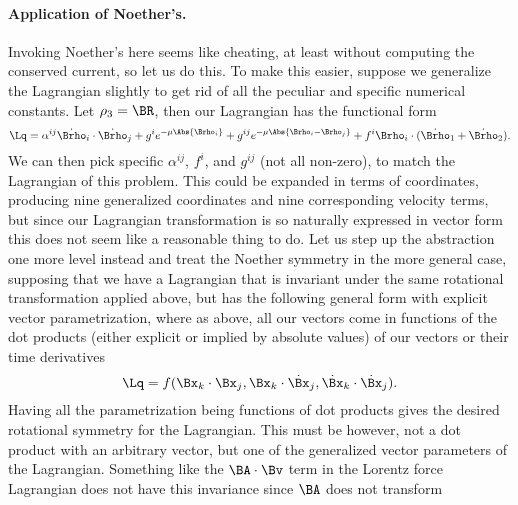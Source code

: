 {\paragraph{Application of Noether's.}
Invoking Noether's here seems like cheating, at least without computing the conserved current, so let us do this.
%
%
To make this easier, suppose we generalize the Lagrangian slightly to get rid of all the peculiar and specific numerical constants.  Let
\(\rho_3 = \BR\), then our Lagrangian has the functional form
%
\begin{equation}\label{eqn:goldsteinCh12:280}
\Lq = \alpha^{ij} \dot{\Brho}_i \cdot \dot{\Brho}_j
+ g^i e^{-\mu \Abs{\Brho_i}}
+ g^{ij} e^{-\mu \Abs{ \Brho_i - \Brho_j }}
+ f^i \Brho_i \cdot ( \dot{\Brho}_1 + \dot{\Brho}_2 ).
\end{equation}
%
We can then pick specific \(\alpha^{ij}\), \(f^{i}\), and \(g^{ij}\) (not all non-zero), to match the Lagrangian of this problem.
This could be expanded in terms of coordinates, producing nine generalized coordinates and nine corresponding velocity terms, but
since our Lagrangian transformation is so naturally expressed in vector form this does not seem like a reasonable thing to do.
%
Let us step up the abstraction one more level instead and treat the Noether symmetry in the more general case, supposing that we have
a Lagrangian that is invariant under the same rotational transformation applied above, but has the following general form with explicit
vector parametrization, where as above, all our vectors come in functions of the dot products (either explicit or implied by
absolute values) of our vectors or their time derivatives
%
\begin{equation}\label{eqn:goldsteinCh12:300}
\Lq = f( {\Bx_k} \cdot {{\Bx}_j}, {\Bx_k} \cdot {\dot{\Bx}_j}, {\dot{\Bx}_k} \cdot {\dot{\Bx}_j} ).
\end{equation}
%
Having all the parametrization being functions of dot products gives the desired rotational symmetry for the Lagrangian.
This must be however, not a dot product with an arbitrary vector, but one of the generalized vector parameters of the Lagrangian.
Something like the \(\BA \cdot \Bv\) term in the Lorentz force Lagrangian does not have this invariance since \(\BA\) does not transform
}
